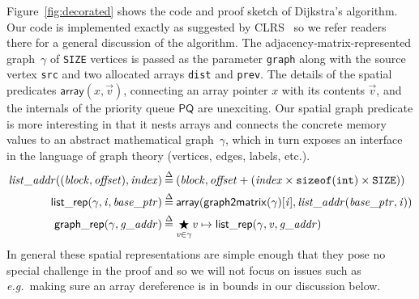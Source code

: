 

\vspace{-0.75em}

Figure~\ref{fig:decorated} shows the code and proof
sketch of Dijkstra's algorithm.  Our code is implemented exactly
as suggested by CLRS~\cite{clrs} so we refer readers there for a
general discussion of the algorithm.
The adjacency-matrix-represented graph~$\gamma$ of \texttt{SIZE} vertices
is passed as the parameter \texttt{graph} along with the source vertex \texttt{src}
and two allocated arrays \texttt{dist} and \texttt{prev}.
The details of the spatial predicates $\mathsf{array}(x,\vec{v})$, connecting an array pointer $x$ with its contents $\vec{v}$, and the internals of the priority
queue $\mathsf{PQ}$ are unexciting.  Our spatial graph predicate is more interesting in
that it nests arrays and connects the concrete memory values to an abstract mathematical
graph~$\gamma$, which in turn exposes an interface in the language of graph theory
(vertices, edges, labels, etc.).
\vspace{-0.5em}
\begin{equation*}
\begin{split}
\m{list\_addr} ((\m{block}, \m{offset}), \m{index}) &\defeq
  (\m{block}, \m{offset} + (\m{index} \times \texttt{sizeof}(\texttt{int}) \times \texttt{SIZE})) \\
\p{list\_rep}(\gamma, \m{i}, \m{base\_ptr}) &\defeq \mathsf{array}(\mathsf{graph2matrix}(\gamma)[\m{i}], \m{list\_addr}(\m{base\_ptr}, \m{i})) \\
\vspace{1em}
\p{graph\_rep}(\gamma, \m{g\_addr}) &\defeq \underset{\m{v} \in \gamma}{\bigstar} \m{v}  \mapsto\p{list\_rep}(\gamma, \m{v}, \m{g\_addr})
\end{split}
\end{equation*}
In general these spatial representations are simple enough that they pose no special
challenge in the proof and so we will not focus on issues such as \emph{e.g.}~making
sure an array dereference is in bounds in our discussion below.

